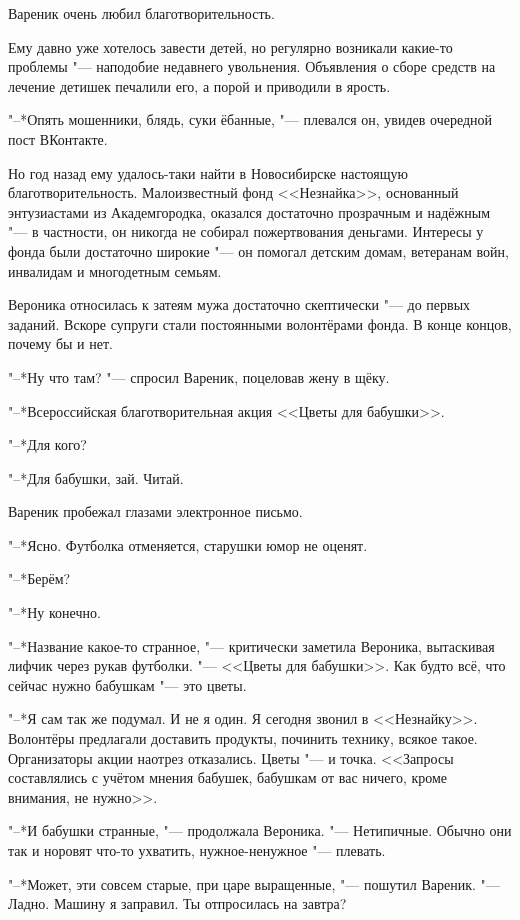 Вареник очень любил благотворительность.

Ему давно уже хотелось завести детей, но регулярно возникали какие-то проблемы "--- наподобие недавнего увольнения.
Объявления о сборе средств на лечение детишек печалили его, а порой и приводили в ярость.

"--*Опять мошенники, блядь, суки ёбанные, "--- плевался он, увидев очередной пост ВКонтакте.

Но год назад ему удалось-таки найти в Новосибирске настоящую благотворительность.
Малоизвестный фонд <<Незнайка>>, основанный энтузиастами из Академгородка, оказался достаточно прозрачным и надёжным "--- в частности, он никогда не собирал пожертвования деньгами.
Интересы у фонда были достаточно широкие "--- он помогал детским домам, ветеранам войн, инвалидам и многодетным семьям.

Вероника относилась к затеям мужа достаточно скептически "--- до первых заданий.
Вскоре супруги стали постоянными волонтёрами фонда.
В конце концов, почему бы и нет.

"--*Ну что там? "--- спросил Вареник, поцеловав жену в щёку.

"--*Всероссийская благотворительная акция <<Цветы для бабушки>>.

"--*Для кого?

"--*Для бабушки, зай.
Читай.

Вареник пробежал глазами электронное письмо.

"--*Ясно.
Футболка отменяется, старушки юмор не оценят.

"--*Берём?

"--*Ну конечно.

\asterism

\textspace

"--*Название какое-то странное, "--- критически заметила Вероника, вытаскивая лифчик через рукав футболки.
"--- <<Цветы для бабушки>>.
Как будто всё, что сейчас нужно бабушкам "--- это цветы.

"--*Я сам так же подумал.
И не я один.
Я сегодня звонил в <<Незнайку>>.
Волонтёры предлагали доставить продукты, починить технику, всякое такое.
Организаторы акции наотрез отказались.
Цветы "--- и точка.
<<Запросы составлялись с учётом мнения бабушек, бабушкам от вас ничего, кроме внимания, не нужно>>.

"--*И бабушки странные, "--- продолжала Вероника.
"--- Нетипичные.
Обычно они так и норовят что-то ухватить, нужное-ненужное "--- плевать.

"--*Может, эти совсем старые, при царе выращенные, "--- пошутил Вареник.
"--- Ладно.
Машину я заправил.
Ты отпросилась на завтра?

